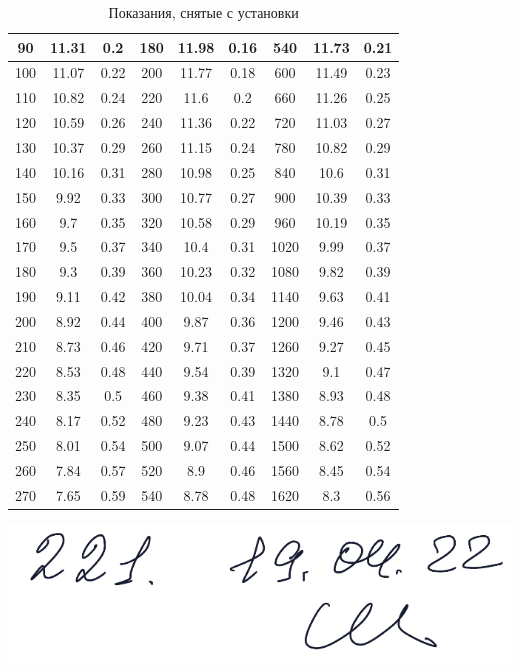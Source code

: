 \documentclass[12pt,a4paper]{article}
\begin{document}
\begin{enumerate}
\begin{table}[htp]
\begin{tabular}{|c|c|c||c|c|c||c|c|c|}
		\hline
	   90  &  11.31  &  0.2  &  180  &  11.98  &  0.16  &  540  &  11.73  &  0.21 \\ 
		\hline
	   100  &  11.07  &  0.22  &  200  &  11.77  &  0.18  &  600  &  11.49  &  0.23 \\ 
		\hline
	   110  &  10.82  &  0.24  &  220  &  11.6  &  0.2  &  660  &  11.26  &  0.25 \\ 
		\hline
	   120  &  10.59  &  0.26  &  240  &  11.36  &  0.22  &  720  &  11.03  &  0.27 \\ 
		\hline
	   130  &  10.37  &  0.29  &  260  &  11.15  &  0.24  &  780  &  10.82  &  0.29 \\ 
		\hline
	   140  &  10.16  &  0.31  &  280  &  10.98  &  0.25  &  840  &  10.6  &  0.31 \\ 
		\hline
	   150  &  9.92  &  0.33  &  300  &  10.77  &  0.27  &  900  &  10.39  &  0.33 \\ 
		\hline
	   160  &  9.7  &  0.35  &  320  &  10.58  &  0.29  &  960  &  10.19  &  0.35 \\ 
		\hline
	   170  &  9.5  &  0.37  &  340  &  10.4  &  0.31  &  1020  &  9.99  &  0.37 \\ 
		\hline
	   180  &  9.3  &  0.39  &  360  &  10.23  &  0.32  &  1080  &  9.82  &  0.39 \\ 
		\hline
	   190  &  9.11  &  0.42  &  380  &  10.04  &  0.34  &  1140  &  9.63  &  0.41 \\ 
		\hline
	   200  &  8.92  &  0.44  &  400  &  9.87  &  0.36  &  1200  &  9.46  &  0.43 \\ 
		\hline
	   210  &  8.73  &  0.46  &  420  &  9.71  &  0.37  &  1260  &  9.27  &  0.45 \\ 
		\hline
	   220  &  8.53  &  0.48  &  440  &  9.54  &  0.39  &  1320  &  9.1  &  0.47 \\ 
		\hline
	   230  &  8.35  &  0.5  &  460  &  9.38  &  0.41  &  1380  &  8.93  &  0.48 \\ 
		\hline
	   240  &  8.17  &  0.52  &  480  &  9.23  &  0.43  &  1440  &  8.78  &  0.5 \\ 
		\hline
	   250  &  8.01  &  0.54  &  500  &  9.07  &  0.44  &  1500  &  8.62  &  0.52 \\ 
		\hline
	   260  &  7.84  &  0.57  &  520  &  8.9  &  0.46  &  1560  &  8.45  &  0.54 \\ 
		\hline
	   270  &  7.65  &  0.59  &  540  &  8.78  &  0.48  &  1620  &  8.3  &  0.56 \\ 
		\hline
	\end{tabular}
	\caption{Показания, снятые с установки}
	\begin{flushright}
		\includegraphics[scale=0.2]{sign.jpeg}
	\end{flushright}
\end{table}


\end{enumerate}
\end{document}
